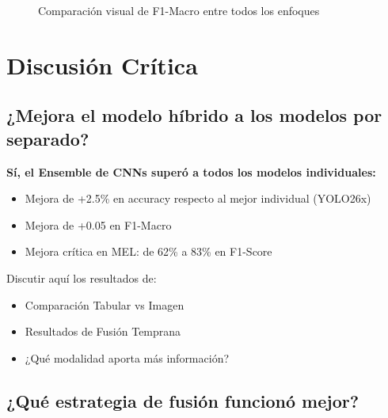 \documentclass[12pt,a4paper]{article}
\begin{document}

\begin{figure}[H]
\centering
{}
\caption{Comparación visual de F1-Macro entre todos los enfoques}
\label{fig:comparacion_barras}
\end{figure}

\newpage

\section{Discusión Crítica}

\subsection{¿Mejora el modelo híbrido a los modelos por separado?}

\textbf{Sí, el Ensemble de CNNs superó a todos los modelos individuales:}
\begin{itemize}
    \item Mejora de +2.5\% en accuracy respecto al mejor individual (YOLO26x)
    \item Mejora de +0.05 en F1-Macro
    \item Mejora crítica en MEL: de 62\% a 83\% en F1-Score
\end{itemize}

\begin{pendiente}
Discutir aquí los resultados de:
\begin{itemize}
    \item Comparación Tabular vs Imagen
    \item Resultados de Fusión Temprana
    \item ¿Qué modalidad aporta más información?
\end{itemize}
\end{pendiente}

\subsection{¿Qué estrategia de fusión funcionó mejor?}
\end{document}
